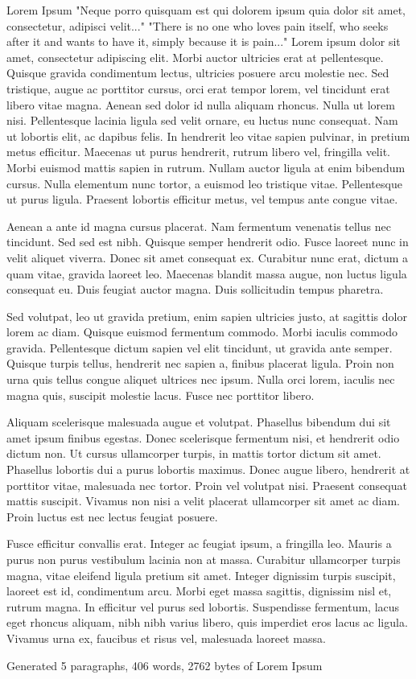 Lorem Ipsum
"Neque porro quisquam est qui dolorem ipsum quia dolor sit amet, consectetur, adipisci velit..."
"There is no one who loves pain itself, who seeks after it and wants to have it, simply because it is pain..."
Lorem ipsum dolor sit amet, consectetur adipiscing elit. Morbi auctor ultricies erat at pellentesque. Quisque gravida condimentum lectus, ultricies posuere arcu molestie nec. Sed tristique, augue ac porttitor cursus, orci erat tempor lorem, vel tincidunt erat libero vitae magna. Aenean sed dolor id nulla aliquam rhoncus. Nulla ut lorem nisi. Pellentesque lacinia ligula sed velit ornare, eu luctus nunc consequat. Nam ut lobortis elit, ac dapibus felis. In hendrerit leo vitae sapien pulvinar, in pretium metus efficitur. Maecenas ut purus hendrerit, rutrum libero vel, fringilla velit. Morbi euismod mattis sapien in rutrum. Nullam auctor ligula at enim bibendum cursus. Nulla elementum nunc tortor, a euismod leo tristique vitae. Pellentesque ut purus ligula. Praesent lobortis efficitur metus, vel tempus ante congue vitae.

Aenean a ante id magna cursus placerat. Nam fermentum venenatis tellus nec tincidunt. Sed sed est nibh. Quisque semper hendrerit odio. Fusce laoreet nunc in velit aliquet viverra. Donec sit amet consequat ex. Curabitur nunc erat, dictum a quam vitae, gravida laoreet leo. Maecenas blandit massa augue, non luctus ligula consequat eu. Duis feugiat auctor magna. Duis sollicitudin tempus pharetra.

Sed volutpat, leo ut gravida pretium, enim sapien ultricies justo, at sagittis dolor lorem ac diam. Quisque euismod fermentum commodo. Morbi iaculis commodo gravida. Pellentesque dictum sapien vel elit tincidunt, ut gravida ante semper. Quisque turpis tellus, hendrerit nec sapien a, finibus placerat ligula. Proin non urna quis tellus congue aliquet ultrices nec ipsum. Nulla orci lorem, iaculis nec magna quis, suscipit molestie lacus. Fusce nec porttitor libero.

Aliquam scelerisque malesuada augue et volutpat. Phasellus bibendum dui sit amet ipsum finibus egestas. Donec scelerisque fermentum nisi, et hendrerit odio dictum non. Ut cursus ullamcorper turpis, in mattis tortor dictum sit amet. Phasellus lobortis dui a purus lobortis maximus. Donec augue libero, hendrerit at porttitor vitae, malesuada nec tortor. Proin vel volutpat nisi. Praesent consequat mattis suscipit. Vivamus non nisi a velit placerat ullamcorper sit amet ac diam. Proin luctus est nec lectus feugiat posuere.

Fusce efficitur convallis erat. Integer ac feugiat ipsum, a fringilla leo. Mauris a purus non purus vestibulum lacinia non at massa. Curabitur ullamcorper turpis magna, vitae eleifend ligula pretium sit amet. Integer dignissim turpis suscipit, laoreet est id, condimentum arcu. Morbi eget massa sagittis, dignissim nisl et, rutrum magna. In efficitur vel purus sed lobortis. Suspendisse fermentum, lacus eget rhoncus aliquam, nibh nibh varius libero, quis imperdiet eros lacus ac ligula. Vivamus urna ex, faucibus et risus vel, malesuada laoreet massa.

Generated 5 paragraphs, 406 words, 2762 bytes of Lorem Ipsum